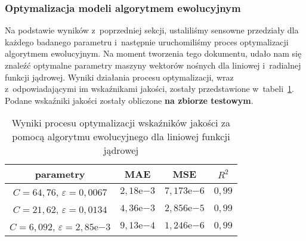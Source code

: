 \subsubsection{Optymalizacja modeli algorytmem ewolucyjnym}
Na podstawie wyników z~poprzedniej sekcji, ustaliliśmy sensowne przedziały dla każdego badanego parametru i~następnie uruchomiliśmy proces optymalizacji algorytmem ewolucyjnym. Na moment tworzenia tego dokumentu, udało nam się znaleźć optymalne parametry maszyny wektorów nośnych dla liniowej i~radialnej funkcji jądrowej. Wyniki działania procesu optymalizacji, wraz z~odpowiadającymi im wskaźnikami jakości, zostały przedstawione w~tabeli~\ref{tab:optim}. Podane wskaźniki jakości zostały obliczone \textbf{na zbiorze testowym}.

\begin{table}[h]
 \centering
 \begin{tabular}{||c c c c||} 
 \hline
 parametry & MAE & MSE & $R^2$ \\ [0.5ex]
 \hline\hline
 $C=64,76$, $\varepsilon=0,0067$ & $2,18\mathrm{e}{-3}$ & $7,173\mathrm{e}{-6}$ & $0,99$ \\ 
 \hline
 $C=21,62$, $\varepsilon=0,0134$ & $4,36\mathrm{e}{-3}$ & $2,856\mathrm{e}{-5}$ & $0,99$ \\ 
 \hline
 $C=6,092$, $\varepsilon=2,85\mathrm{e}{-3}$ & $9,13\mathrm{e}{-4}$ & $1,246\mathrm{e}{-6}$ & $0,99$ \\ 
 \hline

\end{tabular}

\caption{Wyniki procesu optymalizacji wskaźników jakości za pomocą algorytmu ewolucyjnego dla liniowej funkcji jądrowej \label{tab:optim}}
\end{table}

